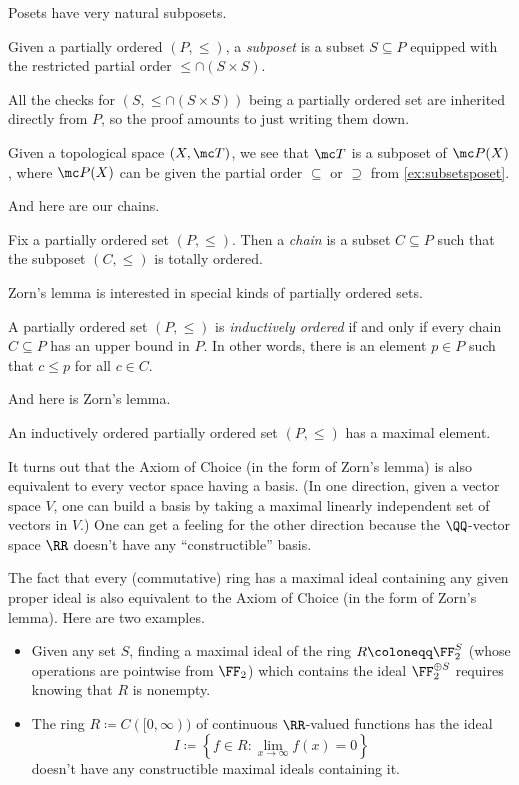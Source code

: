 \documentclass[../notes.tex]{subfiles}
\begin{document}
Posets have very natural subposets.
\begin{definition}[Subposet]
	Given a partially ordered $(P,\le)$, a \textit{subposet} is a subset $S\subseteq P$ equipped with the restricted partial order ${\le}\cap(S\times S)$.
\end{definition}
All the checks for $(S,{\le}\cap(S\times S))$ being a partially ordered set are inherited directly from $P$, so the proof amounts to just writing them down.
\begin{example}
	Given a topological space $(X,\mc T)$, we see that $\mc T$ is a subposet of $\mc P(X)$, where $\mc P(X)$ can be given the partial order $\subseteq$ or $\supseteq$ from \autoref{ex:subsetsposet}.
\end{example}
And here are our chains.
\begin{definition}[Chain]
	Fix a partially ordered set $(P,\le)$. Then a \textit{chain} is a subset $C\subseteq P$ such that the subposet $(C,\le)$ is totally ordered.
\end{definition}
Zorn's lemma is interested in special kinds of partially ordered sets.
\begin{definition}
	A partially ordered set $(P,\le)$ is \textit{inductively ordered} if and only if every chain $C\subseteq P$ has an upper bound in $P$. In other words, there is an element $p\in P$ such that $c\le p$ for all $c\in C$.
\end{definition}
And here is Zorn's lemma.
\begin{ax}
	An inductively ordered partially ordered set $(P,\le)$ has a maximal element.
\end{ax}
\begin{remark}
	It turns out that the Axiom of Choice (in the form of Zorn's lemma) is also equivalent to every vector space having a basis. (In one direction, given a vector space $V$, one can build a basis by taking a maximal linearly independent set of vectors in $V$.) One can get a feeling for the other direction because the $\QQ$-vector space $\RR$ doesn't have any ``constructible'' basis.
\end{remark}
\begin{remark}
	The fact that every (commutative) ring has a maximal ideal containing any given proper ideal is also equivalent to the Axiom of Choice (in the form of Zorn's lemma). Here are two examples.
	\begin{itemize}
		\item Given any set $S$, finding a maximal ideal of the ring $R\coloneqq\FF_2^S$ (whose operations are pointwise from $\FF_2$) which contains the ideal $\FF_2^{\oplus S}$ requires knowing that $R$ is nonempty.
		\item The ring $R\coloneqq C([0,\infty))$ of continuous $\RR$-valued functions has the ideal
		\[I\coloneqq\left\{f\in R:\lim_{x\to\infty}f(x)=0\right\}\]
		doesn't have any constructible maximal ideals containing it.
	\end{itemize}
\end{remark}
\end{document}
